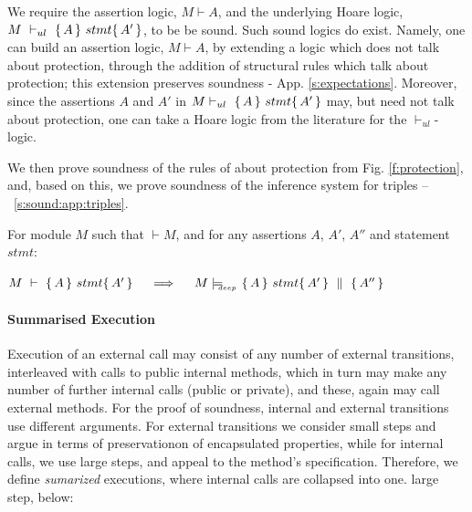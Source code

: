 
\label{sect:prove:triples:sound}
We require the assertion logic,  $M\vdash A$, and  the  underlying Hoare logic,  $M\ \vdash_{ul}\  \triple A {stmt} {A'}$,   to be be  sound. 
Such  sound logics do exist.
Namely, one can build an assertion logic, $M\vdash A$, by extending a logic which does not talk about protection, through the addition of structural rules which talk about protection; this extension preserves soundness - \cf  App. \ref{s:expectations}. 
Moreover,  since the assertions $A$ and $A'$ in $M \vdash_{ul}\   \{\, A \, \}\ stmt \{\, A' \, \}$ may, but need not talk about protection, 
one can take a Hoare logic from the literature for the $ \vdash_{ul}$-logic.

We then prove   soundness of the rules of about protection from Fig. \ref{f:protection}, and, based on this, 
we prove soundness of the inference system for triples  -- \cf \A\ \ref{s:sound:app:triples}.

 

\begin{Theorem}
\label{l:triples:sound}
For module  $M$   such that  $\vdash M$, and for any assertions $A$,  $A'$, $A''$ and statement  $stmt$:
\begin{center}
$M\ \vdash\  \triple A {stmt} {A'}  \ \ \ \  \Longrightarrow  \ \ \ \ \satisfiesD {M} {\quadruple {A} {stmt} {A'} {A''}}$
\end{center}
\end{Theorem}
 

\paragraph{Summarised Execution}
\label{s:summaized}
Execution of an external call may consist of any number of external
transitions, interleaved with calls to public internal methods, which in
turn may make any number of further internal calls (public or private),  %
and these, again may call external methods.
For the   proof of soundness,  internal and external transitions use different arguments.
 For  external transitions we consider small steps  and  argue in terms of  preservationon of  encapsulated properties,
while for internal calls, we use large steps, and appeal to the method's specification.
Therefore, we define  \emph{sumarized} executions, where  internal calls are collapsed into one. large step, \eg below:
  

